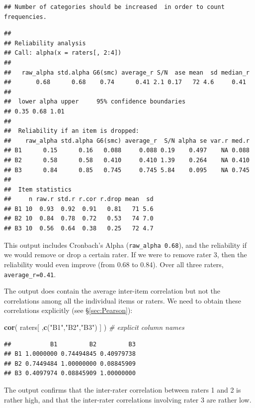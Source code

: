 \documentclass[
]{book}
\newenvironment{Shaded}{\begin{snugshade}}{\end{snugshade}}
\newcommand{\CommentTok}[1]{\textcolor[rgb]{0.56,0.35,0.01}{\textit{#1}}}
\newcommand{\KeywordTok}[1]{\textcolor[rgb]{0.13,0.29,0.53}{\textbf{#1}}}
\newcommand{\NormalTok}[1]{#1}
\newcommand{\StringTok}[1]{\textcolor[rgb]{0.31,0.60,0.02}{#1}}
\begin{document}
\begin{verbatim}
## Number of categories should be increased  in order to count frequencies.
\end{verbatim}

\begin{verbatim}
## 
## Reliability analysis   
## Call: alpha(x = raters[, 2:4])
## 
##   raw_alpha std.alpha G6(smc) average_r S/N  ase mean  sd median_r
##       0.68      0.68    0.74      0.41 2.1 0.17   72 4.6     0.41
## 
##  lower alpha upper     95% confidence boundaries
## 0.35 0.68 1.01 
## 
##  Reliability if an item is dropped:
##    raw_alpha std.alpha G6(smc) average_r  S/N alpha se var.r med.r
## B1      0.15      0.16   0.088     0.088 0.19    0.497    NA 0.088
## B2      0.58      0.58   0.410     0.410 1.39    0.264    NA 0.410
## B3      0.84      0.85   0.745     0.745 5.84    0.095    NA 0.745
## 
##  Item statistics 
##     n raw.r std.r r.cor r.drop mean  sd
## B1 10  0.93  0.92  0.91   0.81   71 5.6
## B2 10  0.84  0.78  0.72   0.53   74 7.0
## B3 10  0.56  0.64  0.38   0.25   72 4.7
\end{verbatim}

This output includes Cronbach's Alpha (\texttt{raw\_alpha\ 0.68}), and the
reliability if we would remove or drop a certain rater.
If we were to remove rater 3, then the reliability would even
improve (from 0.68 to 0.84). Over all three raters,
\texttt{average\_r=0.41}.

The output does contain the average inter-item correlation but not the correlations among all the individual items or raters.
We need to obtain these correlations explicitly (see §\ref{sec:Pearson}):

\begin{Shaded}
\begin{Highlighting}[]
\KeywordTok{cor}\NormalTok{( raters[ ,}\KeywordTok{c}\NormalTok{(}\StringTok{"B1"}\NormalTok{,}\StringTok{"B2"}\NormalTok{,}\StringTok{"B3"}\NormalTok{) ] ) }\CommentTok{\# explicit column names}
\end{Highlighting}
\end{Shaded}

\begin{verbatim}
##           B1         B2         B3
## B1 1.0000000 0.74494845 0.40979738
## B2 0.7449484 1.00000000 0.08845909
## B3 0.4097974 0.08845909 1.00000000
\end{verbatim}

The output confirms that the inter-rater correlation between raters 1 and 2 is rather high, and that the inter-rater correlations involving rater 3 are rather low.
\end{document}
